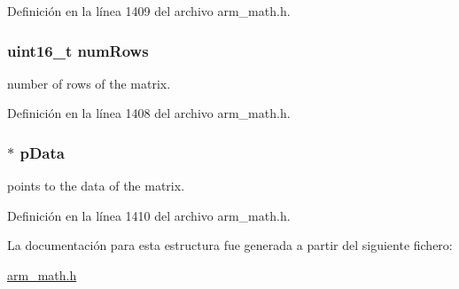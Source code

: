 Definición en la línea 1409 del archivo arm\+\_\+math.\+h.

\subsubsection[{\texorpdfstring{num\+Rows}{numRows}}]{\setlength{\rightskip}{0pt plus 5cm}uint16\+\_\+t num\+Rows}\hypertarget{structarm__matrix__instance__f32_a1bcf80ccdc2acc29198f1592ae300390}{}\label{structarm__matrix__instance__f32_a1bcf80ccdc2acc29198f1592ae300390}
number of rows of the matrix. 

Definición en la línea 1408 del archivo arm\+\_\+math.\+h.

\subsubsection[{\texorpdfstring{p\+Data}{pData}}]{$\ast$ p\+Data}\hypertarget{structarm__matrix__instance__f32_af5c3a2f15c98850cdcfbe6f87e5ac5df}{}\label{structarm__matrix__instance__f32_af5c3a2f15c98850cdcfbe6f87e5ac5df}
points to the data of the matrix. 

Definición en la línea 1410 del archivo arm\+\_\+math.\+h.



La documentación para esta estructura fue generada a partir del siguiente fichero\+:\begin{DoxyCompactItemize}
\item 
\hyperlink{arm__math_8h}{arm\+\_\+math.\+h}\end{DoxyCompactItemize}
